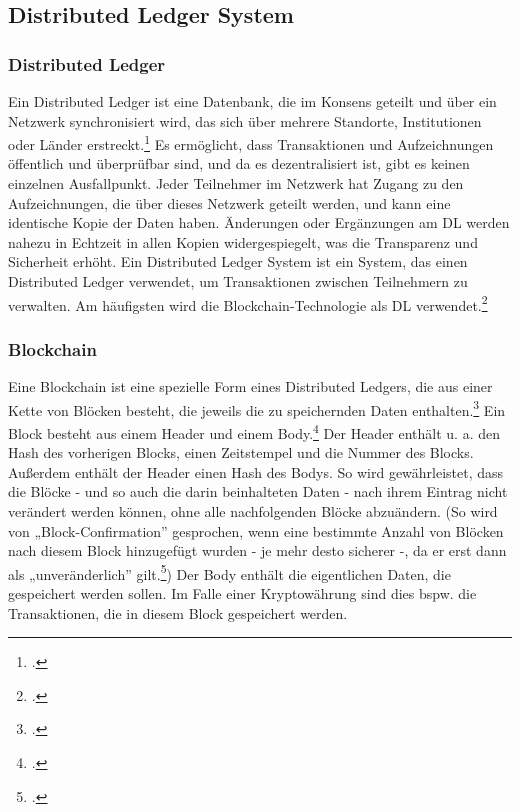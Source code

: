 \noindent

\subsection{Distributed Ledger System}
\label{sec:definition-dls}

\subsubsection{Distributed Ledger}
\label{sec:definition-distributed-ledger}
Ein Distributed Ledger ist eine Datenbank, die im Konsens geteilt und über ein Netzwerk synchronisiert wird, das sich über mehrere Standorte, Institutionen oder Länder erstreckt.\footcite[Vgl. hierzu und im Folgenden][]{w1,w2} 
Es ermöglicht, dass Transaktionen und Aufzeichnungen öffentlich und überprüfbar sind, und da es dezentralisiert ist, gibt es keinen einzelnen Ausfallpunkt. 
Jeder Teilnehmer im Netzwerk hat Zugang zu den Aufzeichnungen, die über dieses Netzwerk geteilt werden, und kann eine identische Kopie der Daten haben. Änderungen oder Ergänzungen am DL werden nahezu in Echtzeit in allen Kopien widergespiegelt, was die Transparenz und Sicherheit erhöht.
\bigbreak
\noindent
Ein Distributed Ledger System ist ein System, das einen Distributed Ledger verwendet, um Transaktionen zwischen Teilnehmern zu verwalten. Am häufigsten wird die Blockchain-Technologie als DL verwendet.\footcite[Vgl.][]{w3}

\subsubsection{Blockchain}
\label{sec:definition-blockchain}
Eine Blockchain ist eine spezielle Form eines Distributed Ledgers, die aus einer Kette von Blöcken besteht, die jeweils die zu speichernden Daten enthalten.\footcite[Vgl.][16]{q3} 
Ein Block besteht aus einem Header und einem Body.\footcites[Vgl. hierzu und im Folgenden][S. 161 ff\adddot]{q5}[]{w9}
\bigbreak
\noindent
Der Header enthält u. a. den Hash des vorherigen Blocks, einen Zeitstempel und die Nummer des Blocks.
Außerdem enthält der Header einen Hash des Bodys.
So wird gewährleistet, dass die Blöcke - und so auch die darin beinhalteten Daten - nach ihrem Eintrag nicht verändert werden können, ohne alle nachfolgenden Blöcke abzuändern. 
(So wird von „Block-Confirmation” gesprochen, wenn eine bestimmte Anzahl von Blöcken nach diesem Block hinzugefügt wurden - je mehr desto sicherer -, da er erst dann als „unveränderlich” gilt.\footcites[Vgl.][191]{q5})
\bigbreak
\noindent
Der Body enthält die eigentlichen Daten, die gespeichert werden sollen. Im Falle einer Kryptowährung sind dies bspw. die Transaktionen, die in diesem Block gespeichert werden.

